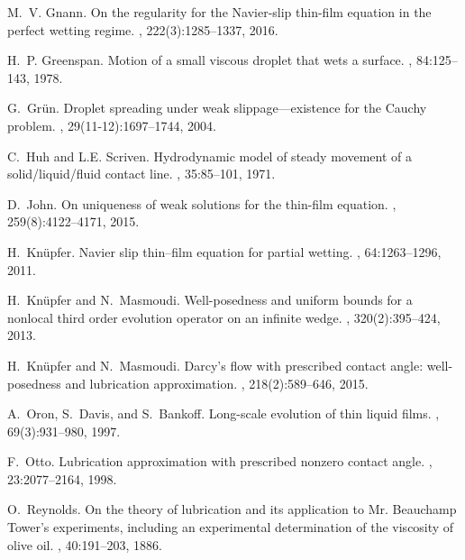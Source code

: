 \documentclass{article}%
\begin{document}
{\begin{thebibliography}{10}
M.~V. Gnann.
\newblock On the regularity for the {N}avier-slip thin-film equation in the
  perfect wetting regime.
, 222(3):1285--1337, 2016.

H.~P. Greenspan.
\newblock Motion of a small viscous droplet that wets a surface.
, 84:125--143, 1978.

G.~Gr{\"u}n.
\newblock Droplet spreading under weak slippage---existence for the {C}auchy
  problem.
, 29(11-12):1697--1744, 2004.

C.~Huh and L.E. Scriven.
\newblock Hydrodynamic model of steady movement of a solid/liquid/fluid contact
  line.
, 35:85--101, 1971.

D.~John.
\newblock On uniqueness of weak solutions for the thin-film equation.
, 259(8):4122--4171, 2015.

H.~Kn{\"u}pfer.
\newblock Navier slip thin--film equation for partial wetting.
, 64:1263--1296, 2011.

H.~Kn{\"u}pfer and N.~Masmoudi.
\newblock Well-posedness and uniform bounds for a nonlocal third order
  evolution operator on an infinite wedge.
, 320(2):395--424, 2013.

H.~Kn\"upfer and N.~Masmoudi.
\newblock Darcy's flow with prescribed contact angle: well-posedness and
  lubrication approximation.
, 218(2):589--646, 2015.

A.~Oron, S.~Davis, and S.~Bankoff.
\newblock Long-scale evolution of thin liquid films.
, 69(3):931--980, 1997.

F.~Otto.
\newblock Lubrication approximation with prescribed nonzero contact angle.
, 23:2077--2164, 1998.

O.~Reynolds.
\newblock On the theory of lubrication and its application to {M}r. {B}eauchamp
  {T}ower's experiments, including an experimental determination of the
  viscosity of olive oil.
, 40:191--203, 1886.

\end{thebibliography}

% 
}
\end{document}
